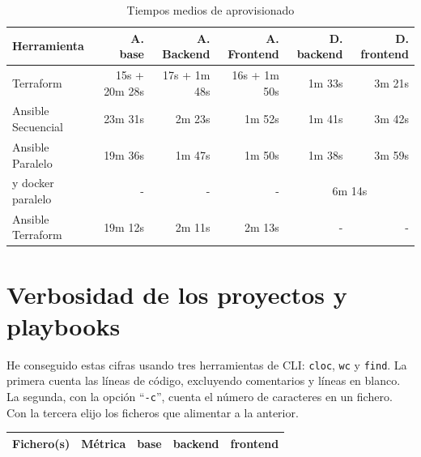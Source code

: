 \documentclass[11pt]{article}
\begin{document}
\begin{flushleft}
\setcounter{table}{0}
\begin{table}[h!]
    \centering
    \begin{tabular}{| l | r | r | r | r | r |}
        \hline
        \textbf{Herramienta} & \textbf{A. base} & \textbf{A. Backend}      & \textbf{A. Frontend}    & \textbf{D. backend} & \textbf{D. frontend} \\
        \hline
        \hline
        Terraform            & 15s + 20m 28s    & 17s + 1m 48s             & 16s + 1m 50s            & 1m 33s              & 3m 21s               \\
        \hline
        Ansible Secuencial   & 23m 31s          & 2m 23s                   & 1m 52s                  & 1m 41s              & 3m 42s               \\
        \hline
        Ansible Paralelo     & 19m 36s          & 1m 47s                   & 1m 50s                  & 1m 38s              & 3m 59s               \\
        \hline
        y docker paralelo    & -                & -                        & -                       & \multicolumn{2}{c|}{6m 14s}                \\
        \hline
        Ansible Terraform    & 19m 12s          & 2m 11s                   & 2m 13s                  & -                   & -                    \\
        \hline
    \end{tabular}
    \caption{Tiempos medios de aprovisionado}
    \label{tiempo_aprovisionar}
\end{table}






\clearpage
\section{Verbosidad de los proyectos y playbooks}
\label{anexo:verbosidad}

He conseguido estas cifras usando tres herramientas de CLI: \texttt{cloc}, \texttt{wc} y \texttt{find}. La primera cuenta las líneas de código, excluyendo comentarios y líneas en blanco. La segunda, con la opción ``\texttt{-c}'', cuenta el número de caracteres en un fichero. Con la tercera elijo los ficheros que alimentar a la anterior.
\linebreak

\begin{table}[h!]
    \centering
    \begin{tabular}{| l | l | r | r | r |}
        \hline
        \textbf{Fichero(s)}                 & \textbf{Métrica} & \textbf{base}   & \textbf{backend}  & \textbf{frontend}           \\
        \hline
        \hline
        

\end{tabular}
\end{table}
\end{flushleft}
\end{document}
